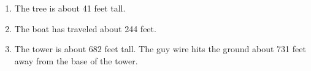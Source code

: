 \begin{enumerate}

\setcounter{enumi}{\value{HW}}

\item  The tree is about 41 feet tall.

\item The boat has traveled about 244 feet.

\item  The tower is about 682 feet tall. The guy wire hits the ground about  731 feet away from the base of the tower.


\end{enumerate}

\closegraphsfile